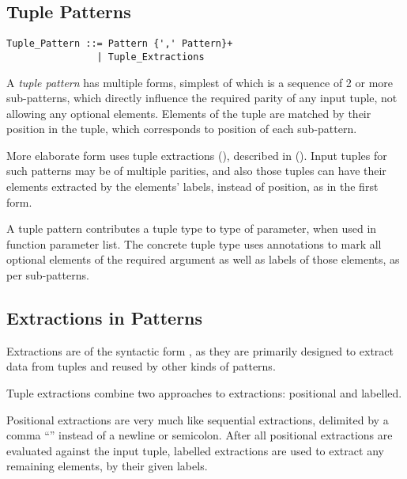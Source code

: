 \subsection{Tuple Patterns}
\label{sec:tuple-patterns}

\syntax\begin{lstlisting}
Tuple_Pattern ::= Pattern {',' Pattern}+
                | Tuple_Extractions
\end{lstlisting}

A {\em tuple pattern} has multiple forms, simplest of which is a sequence of 2 or more sub-patterns, which directly influence the required parity of any input tuple, not allowing any optional elements. Elements of the tuple are matched by their position in the tuple, which corresponds to position of each sub-pattern. 

More elaborate form uses tuple extractions (), described in (). Input tuples for such patterns may be of multiple parities, and also those tuples can have their elements extracted by the elements' labels, instead of position, as in the first form. 

A tuple pattern contributes a tuple type to type of parameter, when used in function parameter list. The concrete tuple type uses annotations to mark all optional elements of the required argument as well as labels of those elements, as per sub-patterns. 





\subsection{Extractions in Patterns}
\label{sec:extractions-in-patterns}

Extractions are of the syntactic form , as they are primarily designed to extract data from tuples and reused by other kinds of patterns. 

Tuple extractions combine two approaches to extractions: positional and labelled. 

Positional extractions are very much like sequential extractions, delimited by a comma ``\code{,}'' instead of a newline or semicolon. After all positional extractions are evaluated against the input tuple, labelled extractions are used to extract any remaining elements, by their given labels. 


